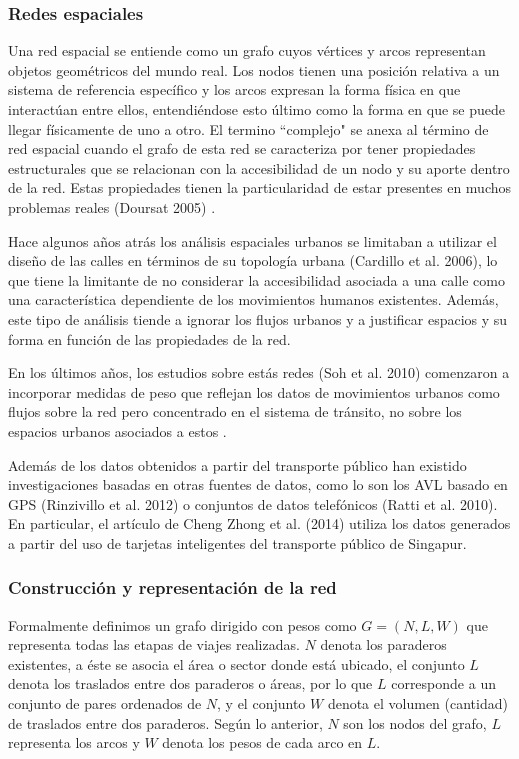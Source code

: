 \documentclass[12pt]{article}
\begin{document}
	\subsubsection{Redes espaciales} 
	
	Una red espacial se entiende como un grafo cuyos vértices y arcos representan objetos geométricos del mundo real. Los nodos tienen una posición relativa a un sistema de referencia específico y los arcos expresan la forma física en que interactúan entre ellos, entendiéndose esto último como la forma en que se puede llegar físicamente de uno a otro. El termino ``complejo"  se anexa al término de red espacial  cuando el grafo de esta red se caracteriza por tener propiedades estructurales que se relacionan con la accesibilidad de un nodo y su aporte dentro de la red. Estas propiedades tienen la particularidad de estar presentes en muchos problemas reales (Doursat 2005) \cite{doursat}.
		
	Hace algunos años atrás los análisis espaciales urbanos se limitaban a utilizar el diseño de las calles en términos de su topología urbana (Cardillo et al. 2006)\cite{cardillo}, lo que tiene la limitante de no considerar la accesibilidad asociada a una calle como una característica dependiente de los movimientos humanos existentes. Además, este tipo de análisis tiende a ignorar los flujos urbanos y a justificar espacios y su forma en función de las propiedades de la red.
	
	En los últimos años, los estudios sobre estás redes (Soh et al. 2010) \cite{soh} comenzaron a incorporar medidas de peso que reflejan los datos de movimientos urbanos como flujos sobre la red pero concentrado en el sistema de tránsito, no sobre los espacios urbanos asociados a estos .
	
	Además de los datos obtenidos a partir del transporte público han existido investigaciones basadas en otras fuentes de datos, como lo son los AVL basado en GPS (Rinzivillo
et al. 2012)\cite{rinzivillo} o conjuntos de datos telefónicos (Ratti et al. 2010)\cite{ratti}. En particular, el artículo de Cheng Zhong et al. (2014)  utiliza los datos generados a partir del uso de tarjetas inteligentes del transporte público de Singapur.
    
    
    \subsubsection{Construcción y representación de la red}\label{sec:contr_y_rep_red} 
	
	Formalmente definimos un grafo dirigido con pesos como $G=(N,L,W)$ que representa todas las etapas de viajes realizadas. $N$ denota los paraderos existentes, a éste se asocia el área o sector donde está ubicado, el conjunto $L$ denota los traslados entre dos paraderos o áreas, por lo que $L$ corresponde a un conjunto de pares ordenados de $N$, y el conjunto $W$ denota el volumen (cantidad) de traslados entre dos paraderos. Según lo anterior, $N$ son los nodos del grafo, $L$ representa los arcos y $W$ denota los pesos de cada arco en $L$.
	
\end{document}
